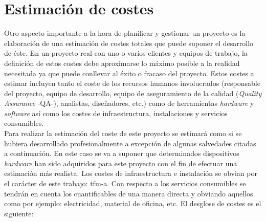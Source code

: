 \documentclass[12pt,a4paper, twoside]{report}
\begin{document}
	\newpage
	
	\section{Estimación de costes}
		
	Otro aspecto importante a la hora de planificar y gestionar un proyecto es la elaboración de una estimación de costes totales que puede suponer el desarrollo de éste. En un proyecto real con uno o varios clientes y equipos de trabajo, la definición de estos costes debe aproximarse lo máximo posible a la realidad necesitada ya que puede conllevar al éxito o fracaso del proyecto. Estos costes a estimar incluyen tanto el coste de los recursos humanos involucrados (responsable del proyecto, equipo de desarrollo, equipo de aseguramiento de la calidad (\textit{Quality Assurance} -QA-), analistas, diseñadores, etc.) como de herramientas \textit{hardware} y \textit{software} así como los costes de infraestructura, instalaciones y servicios consumibles. \\
	
	Para realizar la estimación del coste de este proyecto se estimará como si se hubiera desarrollado profesionalmente a excepción de algunas salvedades citadas a continuación. En este caso se va a suponer que determinados dispositivos \textit{hardware} han sido adquiridos para este proyecto con el fin de efectuar una estimación más realista. Los costes de infraestructura e instalación se obvian por el carácter de este trabajo: \gls{tfm-a}. Con respecto a los servicios consumibles se tendrán en cuenta los cuantificables de una manera directa y obviando aquellos como por ejemplo: electricidad, material de oficina, etc. El desglose de costes es el siguiente: \\
	
	\newpage
	
\end{document}

